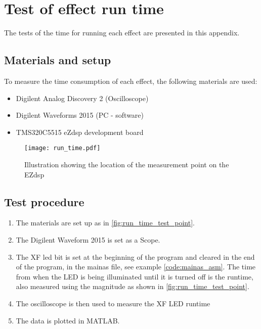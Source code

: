 \chapter{Test of effect run time}\label{app:effect_run_time}

The tests of the time for running each effect are presented in this appendix.

\section*{Materials and setup}
To measure the time consumption of each effect, the following materials are used:
\begin{itemize}
\item Digilent Analog Discovery 2 (Oscilloscope)
\item Digilent Waveforms 2015 (PC - software)
\item TMS320C5515 eZdsp development board
\end{itemize}


\begin{figure}[htbp!]
	\centering
		\texttt{[image: run\_time.pdf]}
		\caption{Illustration showing the location of the measurement point on the EZdsp}
		\label{fig:run_time_test_point}
\end{figure}


\section*{Test procedure}
\begin{enumerate}
\item The materials are set up as in \autoref{fig:run_time_test_point}.
\item The Digilent Waveform 2015 is set as a Scope.
\item  The XF led bit is set at the beginning of the program and cleared in the end of the program, in the mainas file, see example \autoref{code:mainas_asm}. The time from when the LED is being illuminated until it is turned off is the runtime, also measured using the magnitude as shown in \autoref{fig:run_time_test_point}. 
\item  The oscilloscope is then used to measure the XF LED runtime 
\item The data is plotted in MATLAB.
\end{enumerate}

